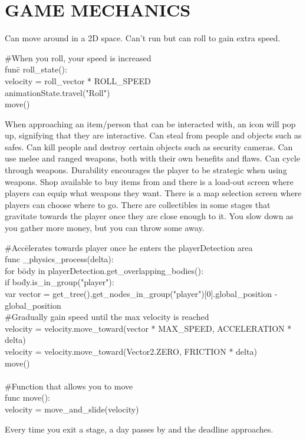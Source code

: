 \documentclass{article}
\begin{document}
\section{GAME MECHANICS \label{mechanics}}
Can move around in a 2D space. Can't run but can roll to gain extra speed.
\bigbreak
\begin{tabbing}
\#When you roll, your speed is increased\\
fun\= c roll\_state():\\
\>	velocity = roll\_vector * ROLL\_SPEED\\
\>	animationState.travel("Roll")\\
\>	move()\\
\end{tabbing}
\bigbreak
When approaching an item/person that can be interacted with, an icon will pop up, signifying that they are interactive. Can steal from people and objects such as safes. Can kill people and destroy certain objects such as security cameras. Can use melee and ranged weapons, both with their own benefits and flaws. Can cycle through weapons. Durability encourages the player to be strategic when using weapons. Shop available to buy items from and there is a load-out screen where players can equip what weapons they want. There is a map selection screen where players can choose where to go. There are collectibles in some stages that gravitate towards the player once they are close enough to it. You slow down as you gather more money, but you can throw some away. \label{collectMoney}
\bigbreak
\begin{tabbing}
\#Acc\=elerates towards player once he enters the playerDetection area\\
func \_physics\_process(delta):\\
\> for  b\= ody in playerDetection.get\_overlapping\_bodies():\\
\> \> if bo\=dy.is\_in\_group("player"):\\
\> \> \> var vector = get\_tree().get\_nodes\_in\_group("player")[0].global\_position - global\_position\\
\> \> \> \#Gradually gain speed until the max velocity is reached\\
\> \> \> velocity = velocity.move\_toward(vector * MAX\_SPEED, ACCELERATION * delta) \\
\> velocity = velocity.move\_toward(Vector2.ZERO, FRICTION * delta)\\
\> move()\\ \\
\#Function that allows you to move\\
func move():\\
\> velocity = move\_and\_slide(velocity)
\end{tabbing}
\bigbreak
Every time you exit a stage, a day passes by and the deadline approaches.
\end{document}
